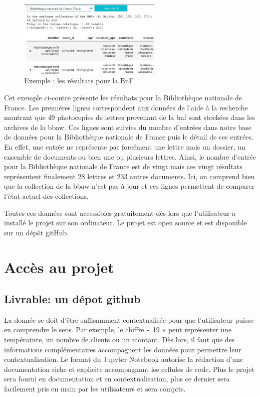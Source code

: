 \documentclass[a4paper, 12pt, twoside]{book}
\begin{document}
\begin{figure}
\includegraphics[width=0.61\textwidth]{img/suchemitFindbuchBnF.jpg}
\caption{Exemple : les résultats pour la BnF}
\end{figure}
Cet exemple ci-contre présente les résultats pour la Bibliothèque nationale de France. Les premières lignes correspondent aux données de l'aide à la recherche montrant que 49 photocopies de lettres provenant de la \gls{bnf} sont stockées dans les archives de la \gls{bbaw}. Ces lignes sont suivies du nombre d'entrées dans notre base de données pour la Bibliothèque nationale de France puis le détail de ces entrées. En effet, une entrée ne représente pas forcément une lettre mais un dossier, un ensemble de documents ou bien une ou plusieurs lettres. Ainsi, le nombre d'entrée pour la Bibliothèque nationale de France est de vingt mais ces vingt résultats représentent finalement 28 lettres et 233 autres documents. Ici, on comprend bien que la collection de la \gls{bbaw} n'est pas à jour et ces lignes permettent de comparer l'état actuel des collections. 

Toutes ces données sont accessibles gratuitement dès lors que l'utilisateur a installé le projet sur son ordinateur. Le projet est open source et est disponible sur un dépôt gitHub.

\section{Accès au projet}
\subsection{Livrable: un dépot github}
La donnée se doit d’être suffisamment contextualisée pour que l’utilisateur puisse en comprendre le sens. Par exemple, le chiffre « 19 » peut représenter une température, un nombre de clients ou un montant. Dès lors, il faut que des informations complémentaires accompagnent les données pour permettre leur contextualisation. Le format du Jupyter Notebook autorise la rédaction d'une documentation riche et explicite accompagnant les cellules de code. Plus le projet sera fourni en documentation et en contextualisation, plus ce dernier sera facilement pris en main par les utilisateurs et sera compris. 
\end{document}

